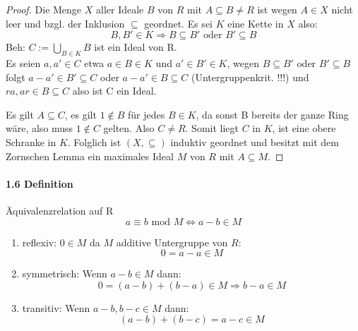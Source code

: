 \documentclass[a4paper]{article}
\begin{document}
\begin{proof}
      Die Menge $ X $ aller Ideale $ B $ von $ R $ mit $ A \subseteq B \neq R $ ist wegen $ A \in X $
      nicht leer und bzgl. der Inklusion $ \subseteq $ geordnet.
      Es sei $ K $ eine Kette in $ X $ also:
      $$ B, B' \in K \Rightarrow B \subseteq B' \text{ oder } B' \subseteq B $$ 
      Beh: $ C := \bigcup_{B \in K} B $ ist ein Ideal von R. \\
      Es seien $ a, a' \in C $ etwa $ a \in B \in K $ und $ a' \in B' \in K $, wegen 
      $ B \subseteq B' \text{ oder } B' \subseteq B $ folgt $ a - a' \in B' \subseteq C $
      oder $ a - a' \in B \subseteq C $  (Untergruppenkrit. !!!) und $ r a, a r \in B \subseteq C $ also ist C ein Ideal.

      Es gilt $ A \subseteq C $, es gilt $ 1 \notin B $ für jedes $ B \in K $, da sonst B bereits der ganze Ring wäre, also 
      muss $ 1 \notin C $ gelten. Also $ C \neq R $. Somit liegt $ C $ in $ K $, ist eine obere Schranke in $ K $.
      Folglich ist $ (X,\subseteq) $ induktiv geordnet und besitzt mit dem Zornschen Lemma ein maximales Ideal $ M $ von $ R $ mit $ A \subseteq M $.
\end{proof}

\paragraph{1.6 Definition} Äquivalenzrelation auf R  %
$$ a \equiv b \text{ mod } M \iff a - b \in M $$
\begin{enumerate}
      \item reflexiv: $ 0 \in M  $ da $ M $ additive Untergruppe von $ R $: 
      $$ 0 =  a - a \in M $$
     \item symmetrisch: Wenn $ a - b \in M $ dann:
      $$  0 = (a - b) + (b - a) \in M \Rightarrow b - a \in M $$
     \item transitiv: Wenn $ a - b, b - c \in M $ dann:
      $$ (a - b) + (b - c) = a - c \in M $$
\end{enumerate}
\end{document}
